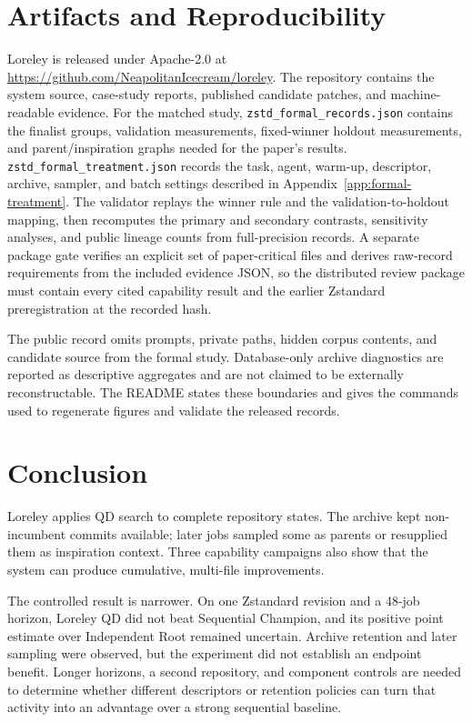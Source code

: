 \documentclass[10pt,twocolumn]{article}
\newcommand{\code}[1]{\texttt{#1}}
\begin{document}
\section{Artifacts and Reproducibility}

Loreley is released under Apache-2.0 at
\url{https://github.com/NeapolitanIcecream/loreley}. The repository contains
the system source, case-study reports, published candidate patches, and
machine-readable evidence. For the matched study,
\code{zstd\_formal\_records.json} contains the finalist groups, validation
measurements, fixed-winner holdout measurements, and parent/inspiration graphs
needed for the paper's results. \code{zstd\_formal\_treatment.json} records the
task, agent, warm-up, descriptor, archive, sampler, and batch settings described
in Appendix~\ref{app:formal-treatment}. The validator replays the winner rule and
the validation-to-holdout mapping, then recomputes the primary and secondary
contrasts, sensitivity analyses, and public lineage counts from full-precision
records. A separate package gate verifies an explicit set of paper-critical
files and derives raw-record requirements from the included evidence JSON, so
the distributed review package must contain every cited capability result and
the earlier Zstandard preregistration at the recorded hash.

The public record omits prompts, private paths, hidden corpus contents, and
candidate source from the formal study. Database-only archive diagnostics are
reported as descriptive aggregates and are not claimed to be externally
reconstructable. The  README states these boundaries and
gives the commands used to regenerate figures and validate the released
records.

\section{Conclusion}

Loreley applies QD search to complete repository states. The archive kept
non-incumbent commits available; later jobs sampled some as parents or
resupplied them as inspiration context. Three capability campaigns also show
that the system can produce cumulative, multi-file improvements.

The controlled result is narrower. On one Zstandard revision and a 48-job
horizon, Loreley QD did not beat Sequential Champion, and its positive point
estimate over Independent Root remained uncertain. Archive retention and later
sampling were observed, but the experiment did not establish an endpoint
benefit. Longer
horizons, a second repository, and component controls are needed to determine
whether different descriptors or retention policies can turn that activity
into an advantage over a strong sequential baseline.
\end{document}
